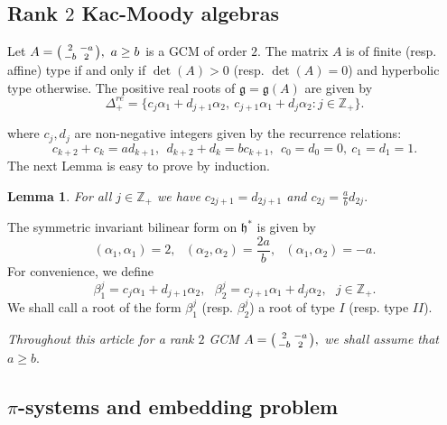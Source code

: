 \documentclass[12pt,reqno]{amsart}
\theoremstyle{plain}
\newtheorem{lem}{Lemma}
\theoremstyle{definition}
\theoremstyle{remark}
\newcommand{\lie}[1]{\mathfrak{#1}}
\newcommand\bz{\mathbb Z}
\begin{document}
\subsection{Rank \texorpdfstring{$2$}{2} Kac-Moody algebras} Let $A=\begin{psmallmatrix}
    2& -a\\ -b & 2
\end{psmallmatrix},\ a\geq b$ is a GCM of order $2.$ The matrix 
$A$ is of finite (resp. affine) type if and only if $\det(A)>0$ (resp. $\det(A)=0$) and hyperbolic type otherwise. The positive real roots of $\lie g=\lie g(A)$ are given by \cite{kac1990infinite}
\begin{equation}\label{realrootsab}
    \Delta^{re}_+=\{c_j\alpha_1+d_{j+1}\alpha_2,\ c_{j+1}\alpha_1+d_j\alpha_2:j\in\bz_+\}.
\end{equation}

where $c_j,d_j$ are non-negative integers given by the recurrence relations:
\begin{equation}\label{recurrenceab}
  c_{k+2}+c_k=ad_{k+1},\ \ d_{k+2}+d_k=bc_{k+1},\ \ c_0=d_0=0,\ c_1=d_1=1.
\end{equation}
The next Lemma is easy to prove by induction. 
\begin{lem}\label{lemrelcd}
    For all $j\in \bz_+$ we have $c_{2j+1}=d_{2j+1}$ and $c_{2j}=\frac{a}{b}d_{2j}.$
\end{lem}
\noindent The symmetric invariant bilinear form on $\lie h^*$ is given by 
$$(\alpha_1,\alpha_1)=2,\ \ \ (\alpha_2,\alpha_2)=\frac{2a}{b},\ \ \ (\alpha_1,\alpha_2)=-a.$$
For convenience, we define 
\begin{equation}\label{realrootstypes}
    \beta_{1}^{j}=c_j\alpha_1+d_{j+1}\alpha_2,\ \ \ \beta_{2}^{j}=c_{j+1}\alpha_1+d_{j}\alpha_2,\ \ \ j\in\bz_+.
\end{equation} We shall call a root of the form $\beta_{1}^{j}$ (resp. $\beta_{2}^{j}$) a root of type $I$ (resp. type $II$).\medskip

\textit{Throughout this article for a rank $2$ GCM $A=\begin{psmallmatrix}2& -a\\ -b & 2\end{psmallmatrix},$ we shall assume that $a\geq b.$}


\subsection{\texorpdfstring{$\pi$}{pi}-systems and embedding problem}\label{secpi}
\end{document}
